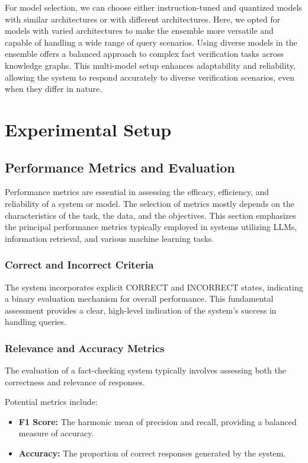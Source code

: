 For model selection, we can choose either instruction-tuned and quantized models with similar architectures or with different architectures.
Here, we opted for models with varied architectures to make the ensemble more versatile and capable of handling a wide range of query scenarios.
Using diverse models in the ensemble offers a balanced approach to complex fact verification tasks across knowledge graphs.
This multi-model setup enhances adaptability and reliability, allowing the system to respond accurately to diverse verification scenarios, even when they differ in nature.

\section{Experimental Setup}\label{sec:empirical-evaluation:experimental-setup}
\subsection{Performance Metrics and Evaluation}\label{subsec:empirical-evaluation:experimental-setup:performance-metrics-and-evaluation}
Performance metrics are essential in assessing the efficacy, efficiency, and reliability of a system or model.
The selection of metrics mostly depends on the characteristics of the task, the data, and the objectives.
This section emphasizes the principal performance metrics typically employed in systems utilizing LLMs, information retrieval, and various machine learning tasks.
\subsubsection{Correct and Incorrect Criteria}
The system incorporates explicit CORRECT and INCORRECT states, indicating a binary evaluation mechanism for overall performance.
This fundamental assessment provides a clear, high-level indication of the system's success in handling queries.
\subsubsection{Relevance and Accuracy Metrics}
The evaluation of a fact-checking system typically involves assessing both the correctness and relevance of responses.

Potential metrics include:
\begin{itemize}
    \item \textbf{F1 Score:} The harmonic mean of precision and recall, providing a balanced measure of accuracy.
    \item \textbf{Accuracy:} The proportion of correct responses generated by the system.
\end{itemize}
